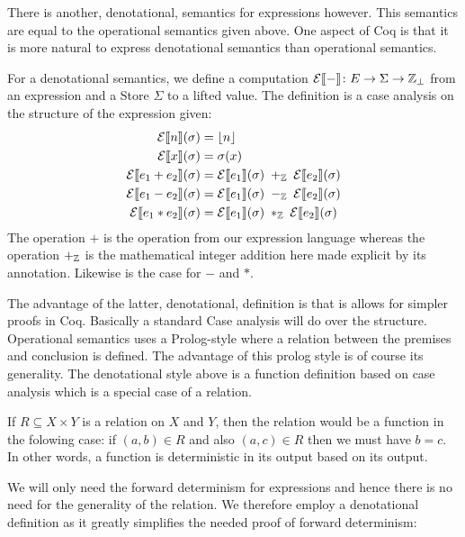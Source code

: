 There is another, denotational, semantics for expressions
however. This semantics are equal to the operational semantics given
above. One aspect of Coq is that it is more natural to express
denotational semantics than operational semantics.

\label{exp:denot-semantics}
For a denotational semantics, we define a computation
$\mathcal{E}|[-|] \colon E \to \Sigma \to \mathbb{Z}_{\perp}$ from an
expression and a Store $\Sigma$ to a lifted value. The definition is a
case analysis on the structure of the expression given:
\begin{align*}
  \mathcal{E}|[n|](\sigma) & = \lfloor n \rfloor\\
  \mathcal{E}|[x|](\sigma) & = \sigma (x)\\
  \mathcal{E}|[e_1 + e_2|](\sigma) & = \mathcal{E}|[e_1|](\sigma) \;
  +_{\mathbb{Z}} \;
  \mathcal{E}|[e_2|](\sigma)\\
  \mathcal{E}|[e_1 - e_2|](\sigma) & = \mathcal{E}|[e_1|](\sigma) \;
  -_{\mathbb{Z}} \;
  \mathcal{E}|[e_2|](\sigma)\\
  \mathcal{E}|[e_1 * e_2|](\sigma) & = \mathcal{E}|[e_1|](\sigma) \;
  *_{\mathbb{Z}} \;
  \mathcal{E}|[e_2|](\sigma)
\end{align*}
The operation $+$ is the operation from our expression language
whereas the operation $+_{\mathbb{Z}}$ is the mathematical integer addition
here made explicit by its annotation. Likewise is the case for $-$ and
$*$.

The advantage of the latter, denotational, definition is that is
allows for simpler proofs in Coq. Basically a standard Case analysis
will do over the structure. Operational semantics uses a Prolog-style
where a relation between the premises and conclusion is defined. The
advantage of this prolog style is of course its generality. The
denotational style above is a function definition based on case
analysis which is a special case of a relation.

If $R \subseteq X \times Y$ is a relation on $X$ and $Y$, then the
relation would be a function in the folowing case: if $(a, b) \in R$
and also $(a, c) \in R$ then we must have $b = c$. In other words, a
function is deterministic in its output based on its output.

We will only need the forward determinism for expressions and hence
there is no need for the generality of the relation. We therefore
employ a denotational definition as it greatly simplifies the needed
proof of forward determinism:

